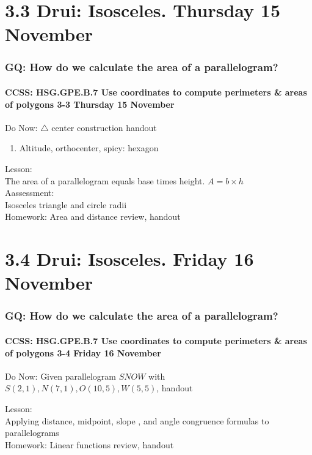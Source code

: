 \documentclass{beamer}
\begin{document}
  \section{3.3 Drui: Isosceles. Thursday 15 November}
    \frame
    {
      \frametitle{GQ: How do we calculate the area of a parallelogram?}
      \framesubtitle{CCSS: HSG.GPE.B.7 Use coordinates to compute perimeters \& areas of polygons  \alert{3-3 Thursday 15 November}}

      \begin{block}{Do Now: $\triangle$ center construction handout}
        \begin{enumerate}
            \item Altitude, orthocenter, spicy: hexagon
        \end{enumerate}
      \end{block}
      Lesson: \\
      The area of a parallelogram equals base times height. $A=b \times h$ \\[0.2cm]
      Aassessment: \\
      Isosceles triangle  and circle radii\\[0.2cm]
      Homework: Area and distance review, handout
    }

  \section{3.4 Drui: Isosceles. Friday 16 November}
    \frame
    {
      \frametitle{GQ: How do we calculate the area of a parallelogram?}
      \framesubtitle{CCSS: HSG.GPE.B.7 Use coordinates to compute perimeters \& areas of polygons  \alert{3-4 Friday 16 November}}

      \begin{block}{Do Now: Given parallelogram $SNOW$ with $S(2,1),N(7,1),O(10,5),W(5,5)$, handout}
      \end{block}
      Lesson: \\
      Applying distance, midpoint, slope , and angle congruence formulas to parallelograms\\[0.5cm]
      Homework: Linear functions review, handout
    }
\end{document}
